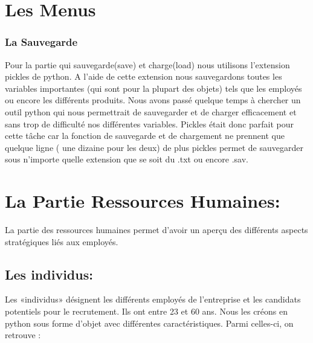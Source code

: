 \section{Les Menus}



\subsubsection*{La Sauvegarde}



Pour la partie qui sauvegarde(save) et charge(load) nous utilisons l’extension pickles de python. A l’aide de cette extension nous sauvegardons toutes les variables importantes (qui sont pour la plupart des objets) tels que les employés ou encore les différents produits.  Nous avons passé quelque temps à chercher un outil python qui nous permettrait de sauvegarder et de charger efficacement et sans trop de difficulté nos différentes variables. Pickles était donc parfait pour cette tâche car la fonction de sauvegarde et de chargement ne prennent que quelque ligne ( une dizaine pour les deux) de plus pickles permet de sauvegarder sous n’importe quelle extension que se soit du .txt ou encore .sav. 











\section{La Partie Ressources Humaines:}



La partie des ressources humaines permet d’avoir un aperçu des différents aspects stratégiques liés aux employés. 



\subsection{Les individus:}



Les «individus» désignent les différents employés de l’entreprise et les candidats potentiels pour le recrutement. Ils ont entre 23 et 60 ans. Nous les créons en python sous forme d’objet avec différentes caractéristiques. Parmi celles-ci, on retrouve : \\



